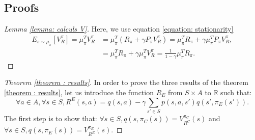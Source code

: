 \documentclass[11pt]{article}
\newcommand{\0}{\mathbf{0}}
\newcommand{\1}{\mathbf{1}}
\begin{document}
\subsection{Proofs}
\begin{proof}[Lemma \ref{lemma: calculs V}]
Here, we use equation \eqref{equation: stationarity}
\begin{align}
E_{s\sim\mu_\pi}[V^\pi_R]=\mu_\pi^TV^\pi_R&=\mu_\pi^T(R_\pi+\gamma P_\pi V^\pi_R)=\mu_\pi^TR_\pi+ \gamma\mu_\pi^TP_\pi V^\pi_R,
\\
&=\mu_\pi^TR_\pi+ \gamma\mu_\pi^TV^\pi_R=\frac{1}{1-\gamma}\mu_\pi^TR_\pi.
\end{align}
\end{proof}
\begin{proof}[Theorem \ref{theorem : results}]
In order to prove the three results of the theorem \ref{theorem : results}, let us introduce the function $R_E$ from $S\times A$ to $\mathbb{R}$ such that:
\begin{equation}
\forall a \in A, \forall s\in S, R^E(s,a)=q(s,a)-\gamma\sum_{s'\in S}p(s,a,s')q(s',\pi_E(s')).
\end{equation}
The first step is to show that: $\forall s\in S, q(s,\pi_C(s))=V^{\pi_C}_{R^C}(s)$ and $\forall s\in S, q(s,\pi_E(s))=V^{\pi_E}_{R^E}(s)$.


\end{proof}
\end{document}
